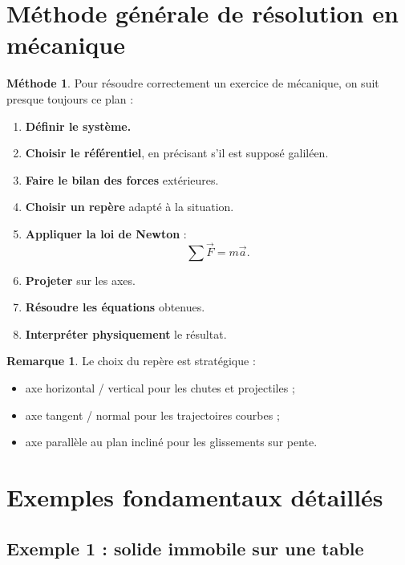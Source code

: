 \documentclass[11pt,a4paper]{article}
\theoremstyle{definition}
\newtheorem{remarque}[definition]{Remarque}
\newtheorem{methode}[definition]{Méthode}
\theoremstyle{plain}
\theoremstyle{remark}
\begin{document}
\section{Méthode générale de résolution en mécanique}

\begin{methode}
Pour résoudre correctement un exercice de mécanique, on suit presque toujours ce plan :
\begin{enumerate}
    \item \textbf{Définir le système.}
    \item \textbf{Choisir le référentiel}, en précisant s'il est supposé galiléen.
    \item \textbf{Faire le bilan des forces} extérieures.
    \item \textbf{Choisir un repère} adapté à la situation.
    \item \textbf{Appliquer la loi de Newton} :
    \[
    \sum \vec{F}=m\vec{a}.
    \]
    \item \textbf{Projeter} sur les axes.
    \item \textbf{Résoudre les équations} obtenues.
    \item \textbf{Interpréter physiquement} le résultat.
\end{enumerate}
\end{methode}

\begin{remarque}
Le choix du repère est stratégique :
\begin{itemize}
    \item axe horizontal / vertical pour les chutes et projectiles ;
    \item axe tangent / normal pour les trajectoires courbes ;
    \item axe parallèle au plan incliné pour les glissements sur pente.
\end{itemize}
\end{remarque}

\section{Exemples fondamentaux détaillés}

\subsection{Exemple 1 : solide immobile sur une table}
\end{document}
